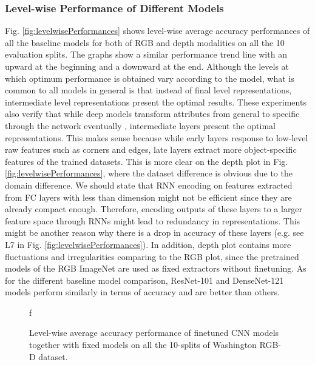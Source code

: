 \subsubsection{Level-wise Performance of Different Models} \label{sec.exp.ma.levelPerformances}
Fig. \ref{fig:levelwisePerformances} shows level-wise average accuracy performances of all the baseline models for both of RGB and depth modalities on all the 10 evaluation splits. The graphs show a similar performance trend line with an upward at the beginning and a downward at the end. Although the levels at which optimum performance is obtained vary according to the model, what is common to all models in general is that instead of final level representations, intermediate level representations present the optimal results. These experiments also verify that while deep models transform attributes from general to specific through  the network eventually \citep{Razavian_CVPRW_2014, Zeiler_ECCV_2014}, intermediate layers present the optimal representations. This makes sense because while early layers response to low-level raw features such as corners and edges, late layers extract more object-specific features of the trained datasets. This is more clear on the depth plot in Fig. \ref{fig:levelwisePerformances}, where the dataset difference is obvious due to the domain difference. We should state that RNN encoding on features extracted from FC layers with less than  dimension might not be efficient since they are already compact enough. Therefore, encoding outputs of these layers to a larger feature space through RNNs might lead to redundancy in representations. This might be another reason why there is a drop in accuracy of these layers (e.g. see L7 in Fig. \ref{fig:levelwisePerformances}). In addition, depth plot contains more fluctuations and irregularities comparing to the RGB plot, since the pretrained models of the RGB ImageNet are used as fixed extractors without finetuning. As for the different baseline model comparison, ResNet-101 and DenseNet-121 models perform similarly in terms of accuracy and are better than others.
\begin{figure*}[!hb]
	\centering
	 f	\caption{Level-wise average accuracy performance of finetuned CNN models together with fixed models on all the 10-splits of Washington RGB-D dataset.}
	\label{fig:finetuning}
\end{figure*}
